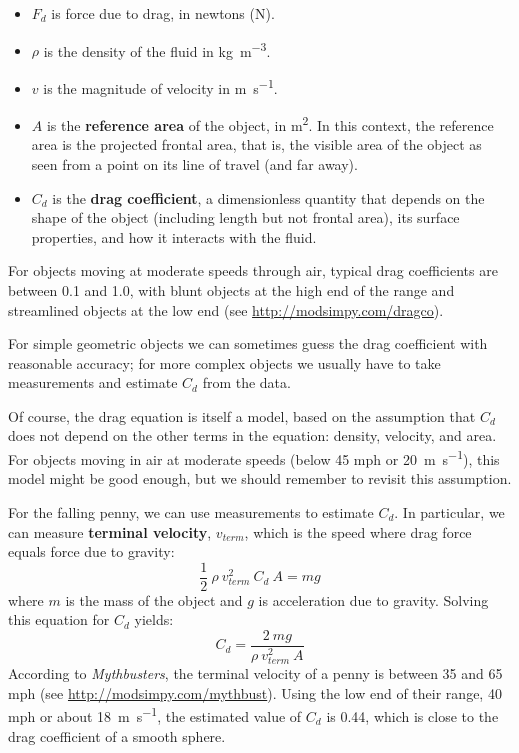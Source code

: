 \documentclass[12pt]{book}
\theoremstyle{exercise}
\begin{document}
\begin{itemize}

\item $F_d$ is force due to drag, in newtons (\si{\newton}).

\item $\rho$ is the density of the fluid in \si{\kg\per\meter\cubed}.

\item $v$ is the magnitude of velocity in \si{\meter\per\second}.

\item $A$ is the {\bf reference area} of the object, in \si{\meter\squared}.  In this context, the reference area is the projected frontal area, that is, the visible area of the object as seen from a point on its line of travel (and far away).


\item $C_d$ is the {\bf drag coefficient}, a dimensionless quantity that depends on the shape of the object (including length but not frontal area), its surface properties, and how it interacts with the fluid.


\end{itemize}

For objects moving at moderate speeds through air, typical drag coefficients are between 0.1 and 1.0, with blunt objects at the high end of the range and streamlined objects at the low end (see \url{http://modsimpy.com/dragco}).

For simple geometric objects we can sometimes guess the drag coefficient with reasonable accuracy; for more complex objects we usually have to take measurements and estimate $C_d$ from the data.

Of course, the drag equation is itself a model, based on the assumption that $C_d$ does not depend on the other terms in the equation: density, velocity, and area.  For objects moving in air at moderate speeds (below 45 mph or \SI{20}{\meter\per\second}), this model might be good enough, but we should remember to revisit this assumption.


For the falling penny, we can use measurements to estimate $C_d$.   In particular, we can measure {\bf terminal velocity}, $v_{term}$, which is the speed where drag force equals force due to gravity:
%
\[ \frac{1}{2}~\rho~v_{term}^2~C_d~A = m g \]
%
where $m$ is the mass of the object and $g$ is acceleration due to gravity.  Solving this equation for $C_d$ yields:
%
\[ C_d = \frac{2~m g}{\rho~v_{term}^2~A} \]
%
According to {\it Mythbusters}, the terminal velocity of a penny is between 35 and 65 mph (see \url{http://modsimpy.com/mythbust}).  Using the low end of their range, 40 mph or about \SI{18}{\meter\per\second}, the estimated value of $C_d$ is 0.44, which is close to the drag coefficient of a smooth sphere.
\end{document}
